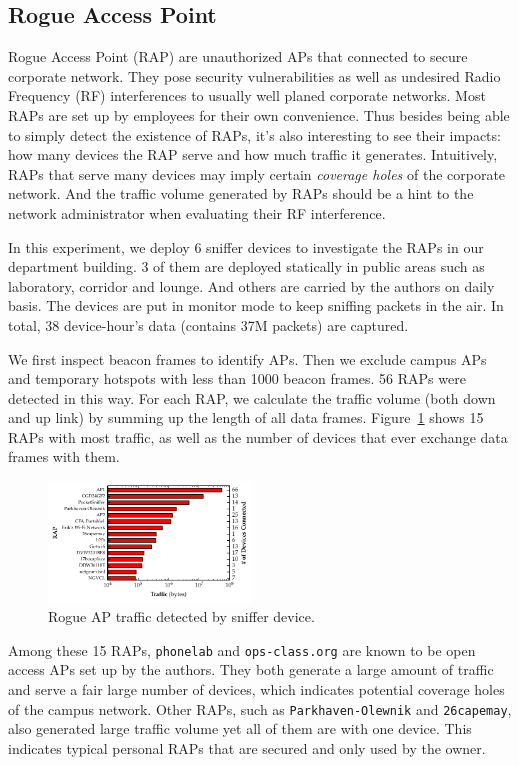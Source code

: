 \subsection{Rogue Access Point}
\label{subsec-rogue}

Rogue Access Point (RAP) are unauthorized APs that connected to secure corporate
network. They pose security vulnerabilities as well as undesired Radio Frequency
(RF) interferences to usually well planed corporate networks. Most RAPs are set
up by employees for their own convenience. Thus besides being able to simply
detect the existence of RAPs, it's also interesting to see their impacts: how
many devices the RAP serve and how much traffic it generates. Intuitively, RAPs 
that serve many devices may imply certain \textit{coverage holes} of the
corporate network. And the traffic volume generated by RAPs should be a hint to
the network administrator when evaluating their RF interference.

In this experiment, we deploy 6 sniffer devices to investigate the RAPs in our
department building.  3 of them are deployed statically in public areas such as
laboratory, corridor and lounge. And others are carried by the authors on daily
basis. The devices are put in monitor mode to keep sniffing packets in the air.
In total, 38 device-hour's data (contains 37M packets) are captured.  

We first inspect beacon frames to identify APs. Then we exclude campus APs and
temporary hotspots with less than 1000 beacon frames. 56 RAPs were
detected in this way. For each RAP, we calculate the traffic volume (both
down and up link) by summing up the length of all data frames.
Figure~\ref{fig:rap} shows 15 RAPs with most traffic, as well as the number of
devices that ever exchange data frames with them.

\begin{figure}[t!]
  \centering
  \includegraphics[width=0.48\textwidth]{./figures/RAPTrafficGraph.pdf}
  \caption{Rogue AP traffic detected by sniffer device.}
  \label{fig:rap}
\end{figure}

Among these 15 RAPs, \texttt{phonelab} and \texttt{ops-class.org} are known to
be open access APs set up by the authors.  They both generate a large amount of
traffic and serve a fair large number of devices, which indicates potential
coverage holes of the campus network. Other RAPs, such as
\texttt{Parkhaven-Olewnik} and \texttt{26capemay}, also generated large traffic
volume yet all of them are with one device. This indicates typical personal RAPs
that are secured and only used by the owner.


